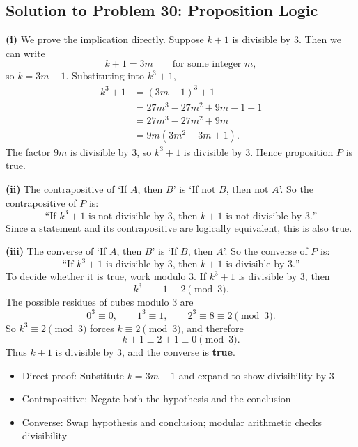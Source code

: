 \subsection{Solution to Problem 30: Proposition Logic}

\begin{solution}
\textbf{(i)} We prove the implication directly. Suppose $k+1$ is divisible by $3$. Then we can write
\[
k+1 = 3m \qquad \text{for some integer } m,
\]
so $k = 3m - 1$. Substituting into $k^3 + 1$,
\begin{align*}
k^3 + 1 &= (3m - 1)^3 + 1 \\
&= 27m^3 - 27m^2 + 9m - 1 + 1 \\
&= 27m^3 - 27m^2 + 9m \\
&= 9m(3m^2 - 3m + 1).
\end{align*}
The factor $9m$ is divisible by $3$, so $k^3 + 1$ is divisible by $3$. Hence proposition $P$ is true.

\textbf{(ii)} The contrapositive of `If $A$, then $B$' is `If not $B$, then not $A$'. So the contrapositive of $P$ is:
\[
\text{``If $k^3+1$ is not divisible by $3$, then $k+1$ is not divisible by $3$.''}
\]
Since a statement and its contrapositive are logically equivalent, this is also true.

\textbf{(iii)} The converse of `If $A$, then $B$' is `If $B$, then $A$'. So the converse of $P$ is:
\[
\text{``If $k^3+1$ is divisible by $3$, then $k+1$ is divisible by $3$.''}
\]
To decide whether it is true, work modulo $3$. If $k^3 + 1$ is divisible by $3$, then
\[
k^3 \equiv -1 \equiv 2 \pmod{3}.
\]
The possible residues of cubes modulo $3$ are
\[
0^3 \equiv 0,\qquad 1^3 \equiv 1,\qquad 2^3 \equiv 8 \equiv 2 \pmod{3}.
\]
So $k^3 \equiv 2 \pmod{3}$ forces $k \equiv 2 \pmod{3}$, and therefore
\[
k + 1 \equiv 2 + 1 \equiv 0 \pmod{3}.
\]
Thus $k+1$ is divisible by $3$, and the converse is \textbf{true}.
\end{solution}

\begin{takeaways}
\begin{itemize}
    \item Direct proof: Substitute $k = 3m - 1$ and expand to show divisibility by $3$
    \item Contrapositive: Negate both the hypothesis and the conclusion
    \item Converse: Swap hypothesis and conclusion; modular arithmetic checks divisibility
\end{itemize}
\end{takeaways}
